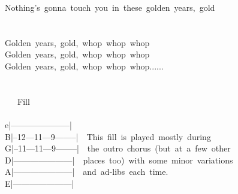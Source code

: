 {Nothing's\ gonna\ touch\ you\ in\ these\ golden\ years,\ gold\\
\\
\\
Golden\ years,\ gold,\ whop\ whop\ whop\\
Golden\ years,\ gold,\ whop\ whop\ whop\\
Golden\ years,\ gold,\ whop\ whop\ whop......\\
\\
\\
\ \ \lbrack\ Fill\rbrack\\
\\
e|---------------------|\\
B|--12---11---9--------|\ \ This\ fill\ is\ played\ mostly\ during\\
G|--11---11---9--------|\ \ the\ outro\ chorus\ (but\ at\ a\ few\ other\\
D|---------------------|\ \ places\ too)\ with\ some\ minor\ variations\\
A|---------------------|\ \ and\ ad-libs\ each\ time.\\
E|---------------------|}
